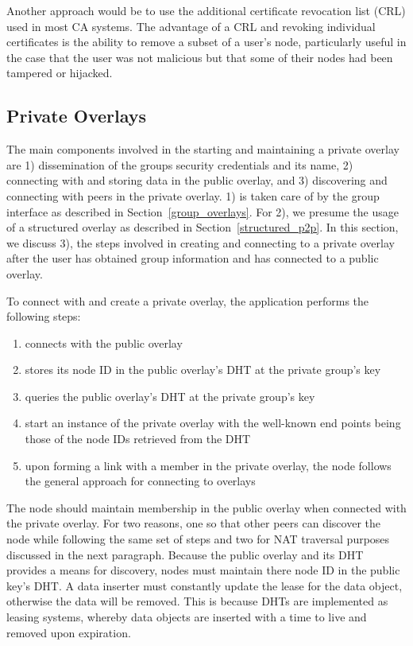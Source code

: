 \documentclass[conference]{IEEEtran}
\begin{document}
Another approach would be to use the additional certificate revocation list
(CRL) used in most CA systems.  The advantage of a CRL and revoking individual
certificates is the ability to remove a subset of a user's node, particularly
useful in the case that the user was not malicious but that some of their nodes
had been tampered or hijacked.

\subsection{Private Overlays}
The main components involved in the starting and maintaining a private overlay
are 1) dissemination of the groups security credentials and its name, 2) 
connecting with and storing data in the public overlay, and 3) discovering and
connecting with peers in the private overlay.  1) is taken care of by the group
interface as described in Section~\ref{group_overlays}.  For 2), we presume the
usage of a structured overlay as described in Section~\ref{structured_p2p}.  In
this section, we discuss 3), the steps involved in creating and connecting to a
private overlay after the user has obtained group information and has connected
to a public overlay.

To connect with and create a private overlay, the application performs the
following steps:
\begin{enumerate}
\setlength{\itemsep}{0pt}
\setlength{\parskip}{0pt}
\item connects with the public overlay
\item stores its node ID in the public overlay's DHT at the private group's key
\item queries the public overlay's DHT at the private group's key
\item start an instance of the private overlay with the well-known end points
being those of the node IDs retrieved from the DHT
\item upon forming a link with a member in the private overlay, the node follows
the general approach for connecting to overlays
\end{enumerate}

The node should maintain membership in the public overlay when connected with
the private overlay.  For two reasons, one so that other peers can discover the
node while following the same set of steps and two for NAT traversal purposes
discussed in the next paragraph.  Because the public overlay and its DHT
provides a means for discovery, nodes must maintain there node ID in the public
key's DHT.  A data inserter must constantly update the lease for the data
object, otherwise the data will be removed.  This is because DHTs are
implemented as leasing systems, whereby data objects are inserted with a time
to live and removed upon expiration.
\end{document}
